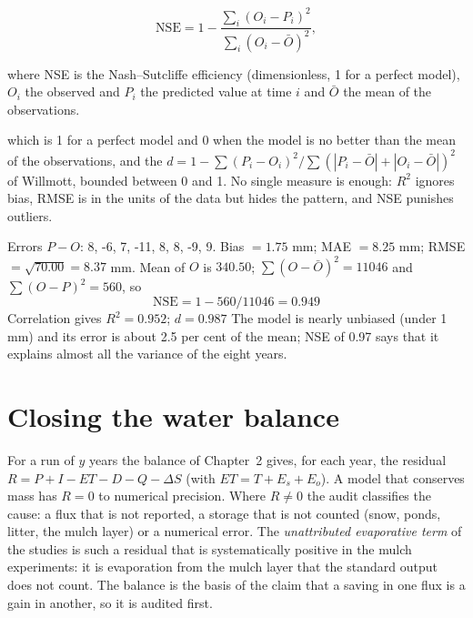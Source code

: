 \begin{equation}\mathrm{NSE}=1-\frac{\sum_i(O_i-P_i)^2}{\sum_i(O_i-\bar O)^2},\label{eq:nse}\end{equation}
\par\noindent where NSE is the Nash--Sutcliffe efficiency (dimensionless, 1 for a perfect model), $O_i$ the observed and $P_i$ the predicted value at time $i$ and $\bar O$ the mean of the observations.



which is 1 for a perfect model and 0 when the model is no better than the mean of the observations, and the  $d=1-\sum(P_i-O_i)^2/\sum(|P_i-\bar O|+|O_i-\bar O|)^2$ of Willmott, bounded between 0 and 1. No single measure is enough: $R^2$ ignores bias, RMSE is in the units of the data but hides the pattern, and NSE punishes outliers.

\sol Errors $P-O$: 8, -6, 7, -11, 8, 8, -9, 9. Bias $=1.75$ mm; MAE $=8.25$ mm; RMSE $=\sqrt{70.00}=8.37$ mm. Mean of $O$ is $340.50$; $\sum(O-\bar O)^2=11046$ and $\sum(O-P)^2=560$, so \[\mathrm{NSE}=1-560/11046=0.949\]
Correlation gives $R^2=0.952$; $d=0.987$ \ans The model is nearly unbiased (under 1 mm) and its error is about 2.5 per cent of the mean; NSE of 0.97 says that it explains almost all the variance of the eight years. \finans

\section{Closing the water balance}
For a run of $y$ years the balance of Chapter~2 gives, for each year, the residual $R=P+I-ET-D-Q-\Delta S$ (with $ET=T+E_s+E_o$). A model that conserves mass has $R=0$ to numerical precision. Where $R\ne0$ the audit classifies the cause: a flux that is not reported, a storage that is not counted (snow, ponds, litter, the mulch layer) or a numerical error. The \emph{unattributed evaporative term} of the studies is such a residual that is systematically positive in the mulch experiments: it is evaporation from the mulch layer that the standard output does not count. The balance is the basis of the claim that a saving in one flux is a gain in another, so it is audited first.

